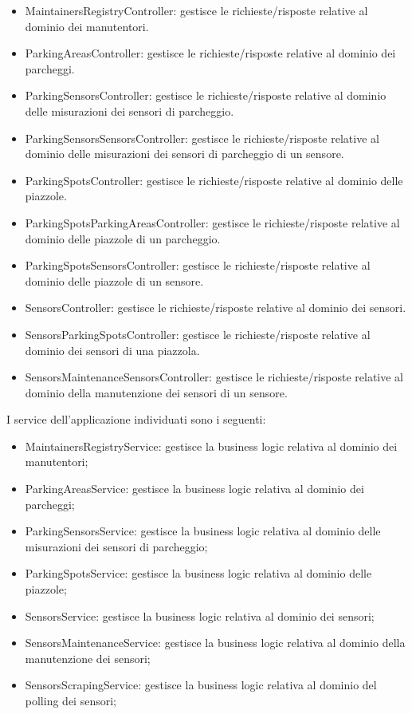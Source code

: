\begin{itemize}
    \item MaintainersRegistryController: gestisce le richieste/risposte relative al dominio dei manutentori.
    \item ParkingAreasController: gestisce le richieste/risposte relative al dominio dei parcheggi.
    \item ParkingSensorsController: gestisce le richieste/risposte relative al dominio delle misurazioni
    dei sensori di parcheggio.
    \item ParkingSensorsSensorsController: gestisce le richieste/risposte relative al dominio delle misurazioni
    dei sensori di parcheggio di un sensore.
    \item ParkingSpotsController: gestisce le richieste/risposte relative al dominio delle piazzole.
    \item ParkingSpotsParkingAreasController: gestisce le richieste/risposte relative al dominio delle piazzole
    di un parcheggio.
    \item ParkingSpotsSensorsController: gestisce le richieste/risposte relative al dominio delle piazzole
    di un sensore.
    \item SensorsController: gestisce le richieste/risposte relative al dominio dei sensori.
    \item SensorsParkingSpotsController: gestisce le richieste/risposte relative al dominio dei sensori di una
    piazzola.
    \item SensorsMaintenanceSensorsController: gestisce le richieste/risposte relative al dominio della manutenzione dei
    sensori di un sensore.
\end{itemize}
\leavevmode\newline
I service dell'applicazione individuati sono i seguenti:
\begin{itemize}
    \item MaintainersRegistryService: gestisce la business logic relativa al dominio dei manutentori;
    \item ParkingAreasService: gestisce la business logic relativa al dominio dei parcheggi;
    \item ParkingSensorsService: gestisce la business logic relativa al dominio delle misurazioni dei sensori di parcheggio;
    \item ParkingSpotsService: gestisce la business logic relativa al dominio delle piazzole;
    \item SensorsService: gestisce la business logic relativa al dominio dei sensori;
    \item SensorsMaintenanceService: gestisce la business logic relativa al dominio della manutenzione dei sensori;
    \item SensorsScrapingService: gestisce la business logic relativa al dominio del polling dei sensori;
\end{itemize}
